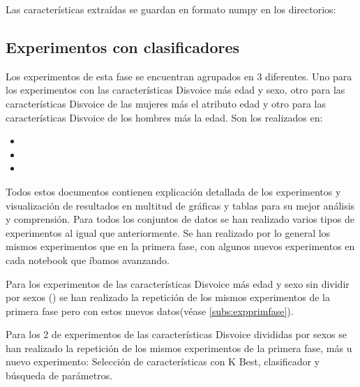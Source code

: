 Las características extraídas se guardan en formato numpy en los directorios: 

\subsection{Experimentos con clasificadores}
Los experimentos de esta fase se encuentran agrupados en 3  diferentes. Uno para los experimentos con las características Disvoice más edad y sexo, otro para las características Disvoice de las mujeres más el atributo edad y otro para las características Disvoice de los hombres más la edad. Son los realizados en:
\begin{itemize}
\item {}
\item {}
\item {}
\end{itemize} 
Todos estos documentos contienen explicación detallada de los experimentos y visualización de resultados en multitud de gráficas y tablas para su mejor análisis y comprensión. Para todos los conjuntos de datos se han realizado varios tipos de experimentos al igual que anteriormente. Se han realizado por lo general los mismos experimentos que en la primera fase, con algunos nuevos experimentos en cada notebook que íbamos avanzando.

Para los experimentos de las características Disvoice más edad y sexo sin dividir por sexos () se han realizado la repetición de los mismos experimentos de la primera fase pero con estos nuevos datos(véase \ref{subs:expprimfase}).

Para los 2  de experimentos de las características Disvoice divididas por sexos se han realizado la repetición de los mismos experimentos de la primera fase, más u nuevo experimento: Selección de características con K Best, clasificador  y búsqueda de parámetros.



